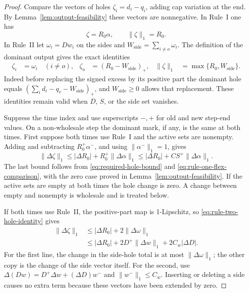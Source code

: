 \begin{proof}
Compare the vectors of holes
\(\zeta_i=d_i-q_i\), adding cap variation at the end.  By
Lemma~\ref{lem:output-feasibility} these vectors are nonnegative.
In Rule~I one has
\begin{equation}
 \zeta=R_0\alpha,
 \qquad \|\zeta\|_1=R_0.
 \label{eq:rule-one-hole-identity}
\end{equation}
In Rule~II let \(\omega_i=Dw_i\) on the sides and
\(W_{\mathrm{side}}=\sum_{i\ne o}\omega_i\).  The definition of the
dominant output gives the exact identities
\begin{align}
 \zeta_i&=\omega_i\quad(i\ne o),&
 \zeta_o&=(R_0-W_{\mathrm{side}})_+,&
 \|\zeta\|_1&=\max\{R_0,W_{\mathrm{side}}\}.
 \label{eq:rule-two-hole-identity}
\end{align}
Indeed before replacing the signed excess by its positive part the
dominant hole equals
\((\sum_i d_i-q_v-W_{\mathrm{side}})_+\), and
\(W_{\mathrm{side}}\ge0\) allows that replacement.  These identities
remain valid when \(D\), \(S\), or the side set vanishes.

Suppress the time index and use superscripts \(-,+\) for old and new
step-end values.  On a non-wholesale step the dominant mark, if any,
is the same at both times.  First suppose both times use Rule~I and
the active sets are nonempty.  Adding and subtracting
\(R_0^+\alpha^-\), and using \(\|\alpha^-\|_1=1\), gives
\begin{equation}
 \|\Delta\zeta\|_1
 \le |\Delta R_0|+R_0^+\|\Delta\alpha\|_1
 \le |\Delta R_0|+C S^+\|\Delta\alpha\|_1.
 \label{eq:hole-movement-one}
\end{equation}
The last bound follows from \eqref{eq:required-hole-bound} and
\eqref{eq:rule-one-flex-comparison}, with the zero case proved in
Lemma~\ref{lem:output-feasibility}.  If the active sets are empty at
both times the hole change is zero.  A change between empty and
nonempty is wholesale and is treated below.

If both times use Rule~II, the positive-part map is 1-Lipschitz, so
\eqref{eq:rule-two-hole-identity} gives
\begin{align}
 \|\Delta\zeta\|_1
 &\le |\Delta R_0|+2\|\Delta\omega\|_1\\
 &\le |\Delta R_0|+2D^+\|\Delta w\|_1
                      +2C_w|\Delta D|.
 \label{eq:hole-movement-two}
\end{align}
For the first line, the change in the side-hole total is at most
\(\|\Delta\omega\|_1\); the other copy is the change of the side
vector itself.  For the second, use
\(\Delta(Dw)=D^+\Delta w+(\Delta D)w^-\) and
\(\|w^-\|_1\le C_w\).  Inserting or deleting a side causes no
extra term because these vectors have been extended by zero.


\end{proof}
